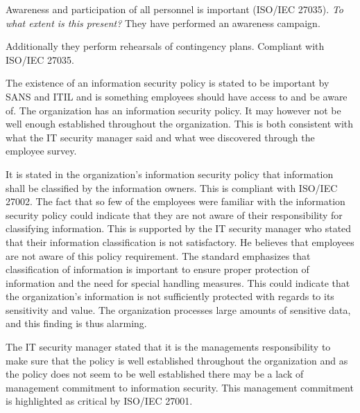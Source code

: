 Awareness and participation of all personnel is important (ISO/IEC 27035). \textit{To what extent is this present?} They have performed an awareness campaign. 

Additionally they perform rehearsals of contingency plans. Compliant with ISO/IEC 27035.

The existence of an information security policy is stated to be important by SANS and \acs{ITIL} and is something employees should have access to and be aware of. The organization has an information security policy. It may however not be well enough established throughout the organization. This is both consistent with what the IT security manager said and what wee discovered through the employee survey.

It is stated in the organization's information security policy that information shall be classified by the information owners. This is compliant with ISO/IEC 27002. The fact that so few of the employees were familiar with the information security policy could indicate that they are not aware of their responsibility for classifying information. This is supported by the IT security manager who stated that their information classification is not satisfactory. He believes that employees are not aware of this policy requirement. The standard emphasizes that classification of information is important to ensure proper protection of information and the need for special handling measures. This could indicate that the organization's information is not sufficiently protected with regards to its sensitivity and value. The organization processes large amounts of sensitive data, and this finding is thus alarming.

The IT security manager stated that it is the managements responsibility to make sure that the policy is well established throughout the organization and as the policy does not seem to be well established there may be a lack of management commitment to information security. This management commitment is highlighted as critical by ISO/IEC 27001. 

